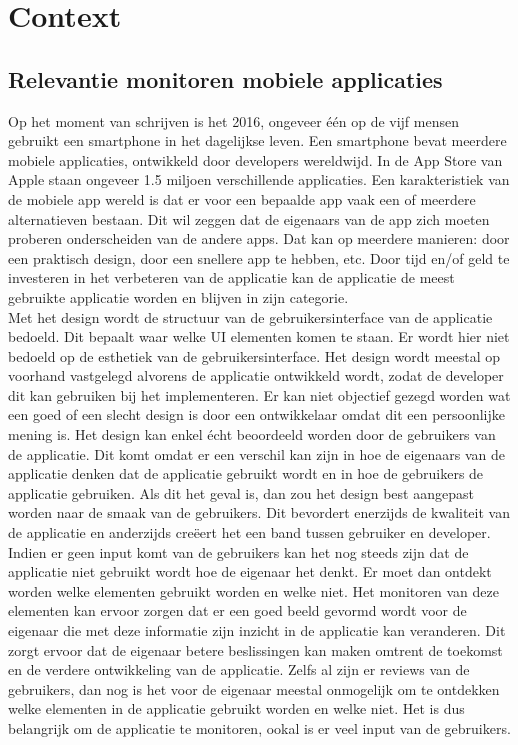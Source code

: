 \chapter{Context}

\section{Relevantie monitoren mobiele applicaties}
Op het moment van schrijven is het 2016, ongeveer \'e\'en op de vijf mensen gebruikt een smartphone in het dagelijkse leven. Een smartphone bevat meerdere mobiele applicaties, ontwikkeld door developers wereldwijd. In de App Store van Apple staan ongeveer 1.5 miljoen verschillende applicaties. Een karakteristiek van de mobiele app wereld is dat er voor een bepaalde app vaak een of meerdere alternatieven bestaan. Dit wil zeggen dat de eigenaars van de app zich moeten proberen onderscheiden van de andere apps. Dat kan op meerdere manieren: door een praktisch design, door een snellere app te hebben, etc. Door tijd en/of geld te investeren in het verbeteren van de applicatie kan de applicatie de meest gebruikte applicatie worden en blijven in zijn categorie. \\

Met het design wordt de structuur van de gebruikersinterface van de applicatie bedoeld. Dit bepaalt waar welke UI elementen komen te staan. Er wordt hier niet bedoeld op de esthetiek van de gebruikersinterface.
Het design wordt meestal op voorhand vastgelegd alvorens de applicatie ontwikkeld wordt, zodat de developer dit kan gebruiken bij het implementeren. Er kan niet objectief gezegd worden wat een goed of een slecht design is door een ontwikkelaar omdat dit een persoonlijke mening is. Het design kan enkel \'echt beoordeeld worden door de gebruikers van de applicatie. Dit komt omdat er een verschil kan zijn in hoe de eigenaars van de applicatie denken dat de applicatie gebruikt wordt en in hoe de gebruikers de applicatie gebruiken. Als dit het geval is, dan zou het design best aangepast worden naar de smaak van de gebruikers. Dit bevordert enerzijds de kwaliteit van de applicatie en anderzijds cre\"eert het een band tussen gebruiker en developer. Indien er geen input komt van de gebruikers kan het nog steeds zijn dat de applicatie niet gebruikt wordt hoe de eigenaar het denkt. Er moet dan ontdekt worden welke elementen gebruikt worden en welke niet. Het monitoren van deze elementen kan ervoor zorgen dat er een goed beeld gevormd wordt voor de eigenaar die met deze informatie zijn inzicht in de applicatie kan veranderen. Dit zorgt ervoor dat de eigenaar betere beslissingen kan maken omtrent de toekomst en de verdere ontwikkeling van de applicatie. Zelfs al zijn er reviews van de gebruikers, dan nog is het voor de eigenaar meestal onmogelijk om te ontdekken welke elementen in de applicatie gebruikt worden en welke niet. Het is dus belangrijk om de applicatie te monitoren, ookal is er veel input van de gebruikers. \\


